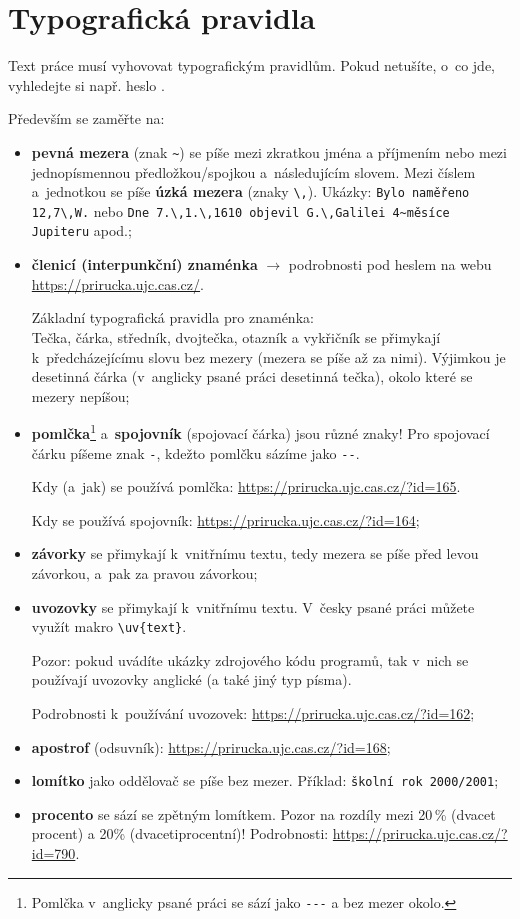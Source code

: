 \section{Typografická pravidla}\label{podkapTypo}
Text práce musí vyhovovat typografickým pravidlům. Pokud netušíte, o~co jde, vyhledejte si např. heslo .
\par 
Především se zaměřte na:
\begin{itemize}\itemsep=2pt
\item \textbf{pevná mezera} (znak {\tt \textasciitilde}) se píše mezi zkratkou jména a příjmením nebo mezi jednopísmennou předložkou/spojkou a~následujícím slovem. Mezi číslem a~jednotkou se píše {\bf úzká mezera} (znaky \texttt{\textbackslash,}). Ukázky: {\tt Bylo naměřeno 12,7\textbackslash,W.} nebo {\tt Dne 7.\textbackslash,1.\textbackslash,1610 objevil G.\textbackslash,Galilei 4\textasciitilde měsíce Jupiteru} apod.;
\item {\bf členicí (interpunkční) znaménka} $\rightarrow$ podrobnosti pod heslem  na webu \url{https://prirucka.ujc.cas.cz/}.\par
Základní typografická pravidla pro znaménka:\\
Tečka, čárka, středník, dvojtečka, otazník a vykřičník se přimykají k~předcházejícímu slovu bez mezery (mezera se píše až za nimi). Výjimkou je desetinná čárka (v~anglicky psané práci desetinná tečka), okolo které se mezery nepíšou;
\item {\bf pomlčka}\footnote{Pomlčka v~anglicky psané práci se sází jako \texttt{-{}-{}-} a bez mezer okolo.} a~{\bf spojovník} (spojovací čárka) jsou různé znaky! Pro spojovací čárku píšeme znak \texttt{-}, kdežto pomlčku sázíme jako \texttt{-{}-}.\par 
Kdy (a~jak) se používá pomlčka: \url{https://prirucka.ujc.cas.cz/?id=165}.\par 
Kdy se používá spojovník: \url{https://prirucka.ujc.cas.cz/?id=164};
\item {\bf závorky} se přimykají k~vnitřnímu textu, tedy mezera se píše před levou závorkou, a~pak za pravou závorkou;
\item \textbf{uvozovky} se přimykají k~vnitřnímu textu. V~česky psané práci můžete využít makro {\tt \textbackslash uv\{text\}}. 
\par
Pozor: pokud uvádíte ukázky zdrojového kódu programů, tak v~nich se používají uvozovky anglické (a také jiný typ písma).
\par Podrobnosti k~používání uvozovek: \url{https://prirucka.ujc.cas.cz/?id=162};
\item \textbf{apostrof} (odsuvník): \url{https://prirucka.ujc.cas.cz/?id=168};
\item \textbf{lomítko} jako oddělovač se píše bez mezer. Příklad: {\tt školní rok 2000/2001}; %
\item \textbf{procento} se sází se zpětným lomítkem. Pozor na rozdíly mezi 20\,\% (dvacet procent) a 20\% (dvacetiprocentní)! Podrobnosti: \url{https://prirucka.ujc.cas.cz/?id=790}.
\end{itemize}


